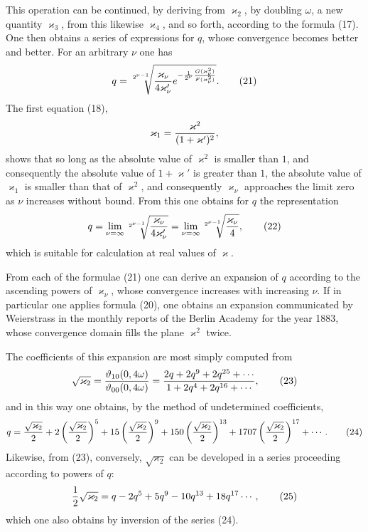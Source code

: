 \documentclass[11pt]{article}
\providecommand{\tht}{\vartheta}
\begin{document}
This operation can be continued, by deriving from $\varkappa_2$, by doubling $\omega$, a new quantity $\varkappa_3$, from this likewise $\varkappa_4$, and so forth, according to the formula (17). One then obtains a series of expressions for $q$, whose convergence becomes better and better. For an arbitrary $\nu$ one has
\begin{equation}
q=\sqrt[2^{\nu-1}]{ {\varkappa_\nu\over4\varkappa_\nu'}
 e^{-{1\over 2^\nu}{G(\varkappa_\nu^2)\over F(\varkappa_\nu^2)}} }.
\tag{21}
\end{equation}
The first equation (18),
\[
\varkappa_1={\varkappa^2\over(1+\varkappa')^2},
\]
shows that so long as the absolute value of $\varkappa^2$ is smaller than $1$, and consequently the absolute value of $1+\varkappa'$ is greater than $1$, the absolute value of $\varkappa_1$ is smaller than that of $\varkappa^2$, and consequently $\varkappa_\nu$ approaches the limit zero as $\nu$ increases without bound. From this one obtains for $q$ the representation
\begin{equation}
q=\lim_{\nu=\infty}\sqrt[2^{\nu-1}]{ {\varkappa_\nu\over4\varkappa_\nu'} }
=\lim_{\nu=\infty}\sqrt[2^{\nu-1}]{ {\varkappa_\nu\over4} },
\tag{22}
\end{equation}
which is suitable for calculation at real values of $\varkappa$.

From each of the formulae (21) one can derive an expansion of $q$ according to the ascending powers of $\varkappa_\nu$, whose convergence increases with increasing $\nu$. If in particular one applies formula (20), one obtains an expansion communicated by Weierstrass in the monthly reports of the Berlin Academy for the year 1883, whose convergence domain fills the plane $\varkappa^2$ twice.

The coefficients of this expansion are most simply computed from
\begin{equation}
\sqrt{\varkappa_2}={\tht_{10}(0,4\omega)\over\tht_{00}(0,4\omega)}
={2q+2q^9+2q^{25}+\cdots\over1+2q^4+2q^{16}+\cdots},
\tag{23}
\end{equation}
and in this way one obtains, by the method of undetermined coefficients,
\begin{equation}
q={\sqrt{\varkappa_2}\over2}
+2\left({\sqrt{\varkappa_2}\over2}\right)^5
+15\left({\sqrt{\varkappa_2}\over2}\right)^9
+150\left({\sqrt{\varkappa_2}\over2}\right)^{13}
+1707\left({\sqrt{\varkappa_2}\over2}\right)^{17}+\cdots.
\tag{24}
\end{equation}
Likewise, from (23), conversely, $\sqrt{\varkappa_2}$ can be developed in a series proceeding according to powers of $q$:
\begin{equation}
{1\over2}\sqrt{\varkappa_2}=q-2q^5+5q^9-10q^{13}+18q^{17}\cdots,
\tag{25}
\end{equation}
which one also obtains by inversion of the series (24).
\end{document}
